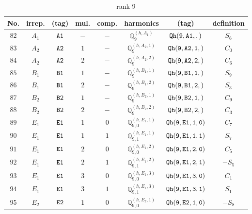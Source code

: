 \documentclass[fleqn,8pt]{jsarticle}
\begin{document}
\begin{table}[ht!]
\begin{center}
\caption{rank 9}
\renewcommand{\arraystretch}{1.3}
\begin{tabular}{cccccccc} \hline \hline
No. & irrep. & (tag) & mul. & comp. & harmonics & (tag) & definition \\ \hline
$ 82 $ & $ A_{1} $ & $ {\tt A1} $ & $ - $ & $ - $ & $ \mathbb{Q}_{9}^{(h,A_{1})} $ & $ {\tt Qh(9,A1,,)} $ & $ S_{6} $ \\
$ 83 $ & $ A_{2} $ & $ {\tt A2} $ & $ 1 $ & $ - $ & $ \mathbb{Q}_{9}^{(h,A_{2},1)} $ & $ {\tt Qh(9,A2,1,)} $ & $ C_{0} $ \\
$ 84 $ & $ A_{2} $ & $ {\tt A2} $ & $ 2 $ & $ - $ & $ \mathbb{Q}_{9}^{(h,A_{2},2)} $ & $ {\tt Qh(9,A2,2,)} $ & $ C_{6} $ \\
$ 85 $ & $ B_{1} $ & $ {\tt B1} $ & $ 1 $ & $ - $ & $ \mathbb{Q}_{9}^{(h,B_{1},1)} $ & $ {\tt Qh(9,B1,1,)} $ & $ S_{9} $ \\
$ 86 $ & $ B_{1} $ & $ {\tt B1} $ & $ 2 $ & $ - $ & $ \mathbb{Q}_{9}^{(h,B_{1},2)} $ & $ {\tt Qh(9,B1,2,)} $ & $ S_{3} $ \\
$ 87 $ & $ B_{2} $ & $ {\tt B2} $ & $ 1 $ & $ - $ & $ \mathbb{Q}_{9}^{(h,B_{2},1)} $ & $ {\tt Qh(9,B2,1,)} $ & $ C_{9} $ \\
$ 88 $ & $ B_{2} $ & $ {\tt B2} $ & $ 2 $ & $ - $ & $ \mathbb{Q}_{9}^{(h,B_{2},2)} $ & $ {\tt Qh(9,B2,2,)} $ & $ C_{3} $ \\
$ 89 $ & $ E_{1} $ & $ {\tt E1} $ & $ 1 $ & $ 0 $ & $ \mathbb{Q}_{9,0}^{(h,E_{1},1)} $ & $ {\tt Qh(9,E1,1,0)} $ & $ C_{7} $ \\
$ 90 $ & $ E_{1} $ & $ {\tt E1} $ & $ 1 $ & $ 1 $ & $ \mathbb{Q}_{9,1}^{(h,E_{1},1)} $ & $ {\tt Qh(9,E1,1,1)} $ & $ S_{7} $ \\
$ 91 $ & $ E_{1} $ & $ {\tt E1} $ & $ 2 $ & $ 0 $ & $ \mathbb{Q}_{9,0}^{(h,E_{1},2)} $ & $ {\tt Qh(9,E1,2,0)} $ & $ C_{5} $ \\
$ 92 $ & $ E_{1} $ & $ {\tt E1} $ & $ 2 $ & $ 1 $ & $ \mathbb{Q}_{9,1}^{(h,E_{1},2)} $ & $ {\tt Qh(9,E1,2,1)} $ & $ - S_{5} $ \\
$ 93 $ & $ E_{1} $ & $ {\tt E1} $ & $ 3 $ & $ 0 $ & $ \mathbb{Q}_{9,0}^{(h,E_{1},3)} $ & $ {\tt Qh(9,E1,3,0)} $ & $ C_{1} $ \\
$ 94 $ & $ E_{1} $ & $ {\tt E1} $ & $ 3 $ & $ 1 $ & $ \mathbb{Q}_{9,1}^{(h,E_{1},3)} $ & $ {\tt Qh(9,E1,3,1)} $ & $ S_{1} $ \\
$ 95 $ & $ E_{2} $ & $ {\tt E2} $ & $ 1 $ & $ 0 $ & $ \mathbb{Q}_{9,0}^{(h,E_{2},1)} $ & $ {\tt Qh(9,E2,1,0)} $ & $ - S_{8} $ \\

\end{tabular}
\end{center}
\end{table}
\end{document}
